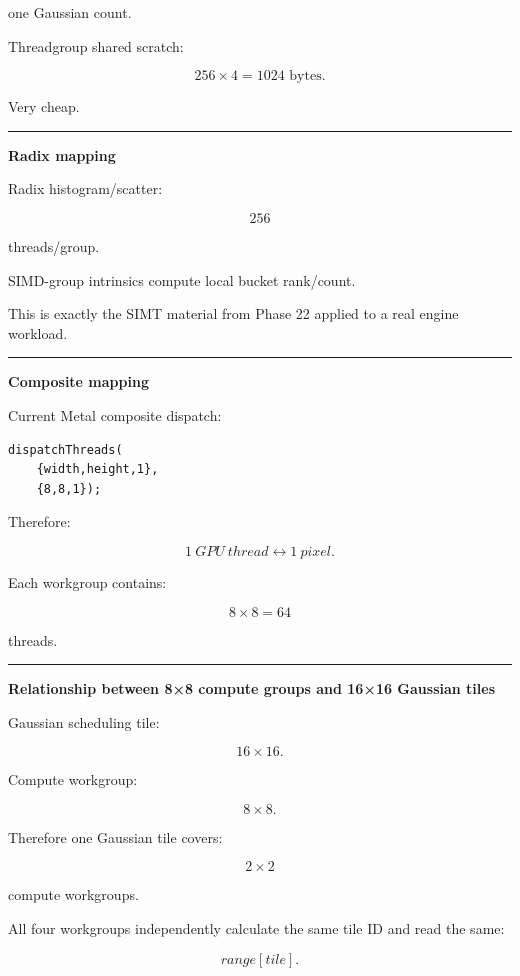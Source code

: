 one Gaussian count.

Threadgroup shared scratch:

\[
256\times4
=
1024\text{ bytes}.
\]

Very cheap.

\begin{center}\rule{0.5\linewidth}{0.5pt}\end{center}

\textbf{Radix mapping}

Radix histogram/scatter:

\[
256
\]

threads/group.

SIMD-group intrinsics compute local bucket rank/count.

This is exactly the SIMT material from Phase 22 applied to a real engine workload.

\begin{center}\rule{0.5\linewidth}{0.5pt}\end{center}

\textbf{Composite mapping}

Current Metal composite dispatch:

\begin{verbatim}
dispatchThreads(
    {width,height,1},
    {8,8,1});
\end{verbatim}

Therefore:

\[
\boxed{
1\ GPU\ thread
\leftrightarrow
1\ pixel.
}
\]

Each workgroup contains:

\[
8\times8=64
\]

threads.

\begin{center}\rule{0.5\linewidth}{0.5pt}\end{center}

\textbf{Relationship between 8×8 compute groups and 16×16 Gaussian tiles}

Gaussian scheduling tile:

\[
16\times16.
\]

Compute workgroup:

\[
8\times8.
\]

Therefore one Gaussian tile covers:

\[
2\times2
\]

compute workgroups.

All four workgroups independently calculate the same tile ID and read the same:

\[
range[tile].
\]

